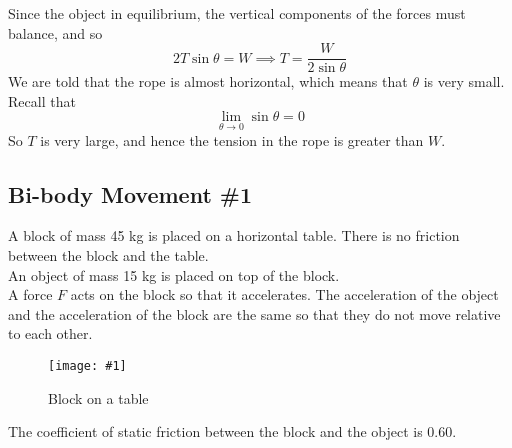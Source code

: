 \documentclass[a4paper,12pt]{article}
\newcommand{\lb}{\\[8pt]}
\newcommand{\img}[4]{\begin{center}
  \begin{figure}[H]
    \centering
    \texttt{[image: \#1]}
    \caption{#3}
    \label{fig:#4}
  \end{figure}
\end{center}}
\begin{document}
\begin{figure}[H]
  \centering
\end{figure}
Since the object in equilibrium, the vertical components of the forces must balance, and so
$$2T\sin \theta = W\implies T = \frac{W}{2\sin\theta}$$
We are told that the rope is almost horizontal, which means that $\theta$ is very small. Recall that $$\lim\limits_{\theta \to 0} \sin \theta = 0$$
So $T$ is very large, and hence the tension in the rope is greater than $W$.


\subsection{Bi-body Movement \#1}

A block of mass 45 kg is placed on a horizontal table.
There is no friction between the block and the table.\lb
An object of mass 15 kg is placed on top of the block.\lb
A force $F$ acts on the block so that it accelerates. The acceleration of the object and the acceleration of the block are the same so that they do not move relative to each other.

\img{ex/7.png}{0.5}{Block on a table}{blocktable}

The coefficient of static friction between the block and the object is 0.60.
\end{document}
